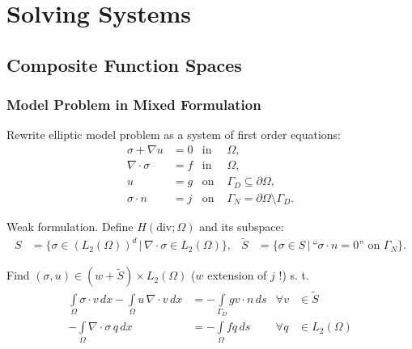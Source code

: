 \section{Solving Systems}

\subsection{Composite Function Spaces}

\begin{frame}
\frametitle{Model Problem in Mixed Formulation}
Rewrite elliptic model problem as a system of first order equations:
\begin{subequations}
\label{Eq:DiffusionEquationMixedForm}
\begin{align*}
\sigma + \nabla u &= 0 & \text{in }& \Omega,\\
\nabla \cdot \sigma     &= f & \text{in }& \Omega,\\
                      u &= g& \text{on }& \Gamma_D\subseteq\partial\Omega,\\
        \sigma\cdot n  &= j& \text{on }& \Gamma_N=\partial\Omega\setminus\Gamma_D.
\end{align*}
\end{subequations}

Weak formulation. Define $H(\text{div};\Omega)$ and its subspace:
\begin{subequations}
\begin{align*}
S &= \{\sigma\in \left(L_2(\Omega)\right)^d \,|\,
\nabla\cdot \sigma \in L_2(\Omega)\}, &
\tilde{S} &= \{\sigma\in S \,|\, \text{``$\sigma\cdot n=0$'' on $\Gamma_N$} \}.
\end{align*}
\end{subequations}

Find $(\sigma,u)\in (w+\tilde{S})\times L_2(\Omega)$ ($w$ extension of $j$ !) s. t.
\begin{align*}
\int\limits_\Omega \sigma\cdot v \, dx  -\int\limits_\Omega
u \, \nabla\cdot v \, dx & =  
-\int\limits_{\Gamma_D} g v\cdot n \, ds 
& \forall v &\in \tilde{S}\\
- \int\limits_\Omega \nabla\cdot\sigma \, q \, dx      &= 
- \int\limits_\Omega f q \, ds &
\forall q &\in L_2(\Omega)
\end{align*}
\end{frame}


